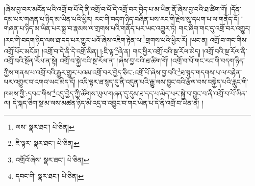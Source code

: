།ཞེས་བྱ་བར་མངོན་པའི་འགྲོ་བ་པོ་དེ་ནི་འགྲོ་བ་པོ་དེ་འགྲོ་བར་བྱེད་པ་མ་ཡིན་ནོ་ཞེས་བྱ་བའི་ཐ་ཚིག་གོ། །དོན་དམ་པར་གཞན་པ་ཉིད་མ་ཡིན་པའི་ཕྱིར། རང་གི་བདག་ཉིད་བཞིན་པས་རང་གི་རྗེས་སུ་དཔག་པ་ལ་གནོད་དོ། །གཞན་པ་ཉིད་མ་ཡིན་པར་སྨྲ་བ་རྣམས་ལ་གྲགས་པའི་གནོད་པར་ཡང་འགྱུར་ཏེ། གང་ཞིག་གང་དུ་འགྲོ་བར་འགྱུར། །རང་གི་བདག་ཉིད་ལས་ཐ་དད་པར་གྱུར་པའོ་ཞེས་འཇིག་རྟེན་ལ་\footnote{ལས་  སྣར་ཐང་།  པེ་ཅིན། }གྲགས་པའི་ཕྱིར་རོ། །ཡང་ན། འགྲོ་བ་གང་གིས་འགྲོ་པོར་མངོན། །འགྲོ་བ་དེ་ནི་དེ་འགྲོ་མིན། །:ཇི་ལྟ་\footnote{ཇི་ལྟར་  སྣར་ཐང་།  པེ་ཅིན། }ཞེ་ན། གང་ཕྱིར་འགྲོ་བའི་སྔ་རོལ་མེད། །འགྲོ་བའི་སྔ་རོལ་ནི་འགྲོ་བའི་སྔོན་རོལ་ན་སྟེ། འགྲོ་བ་སྐྱེ་བའི་སྔ་རོལ་ན། །ཞེས་བྱ་བའི་ཐ་ཚིག་གོ། །འགྲོ་བ་པོ་གང་རང་གི་བདག་ཉིད་ཀྱིས་གནས་པ་འགྲོ་བའི་རྒྱུར་གྱུར་པའམ་འགྲོ་བར་བྱེད་ཅིང་:འགྲོ་པོ་ཞེས་བྱ་བའི་\footnote{འགྲོའོ་ཞེས་  སྣར་ཐང་།  པེ་ཅིན། }ཐ་སྙད་གདགས་པ་ལ་བརྟེན་པར་འགྱུར་བ་འགའ་ཡང་མེད་དོ། །འདི་ལྟར་ཐ་སྙད་དུ་ནི་འདུན་པའི་རྒྱུ་ལས་བྱུང་བའི་རྩོལ་བས་བསྐྱེད་པའི་རླུང་གི་ཁམས་ཀྱི་:དབང་གིས་\footnote{དབང་གི་  སྣར་ཐང་།  པེ་ཅིན། }འདུ་བྱེད་ཀྱི་ཚོགས་ཡུལ་གཞན་དུ་དུས་ཐ་དད་པ་མེད་པར་སྐྱེ་བ་བྱུང་བ་ནི་འགྲོ་བ་པོ་ཡིན་ལ། དེ་སྐད་ཅིག་སྔ་མ་ལས་མཚན་ཉིད་མི་འདྲ་བ་འབྱུང་བ་གང་ཡིན་པ་དེ་ནི་འགྲོ་བ་ཡིན་ནོ། །
